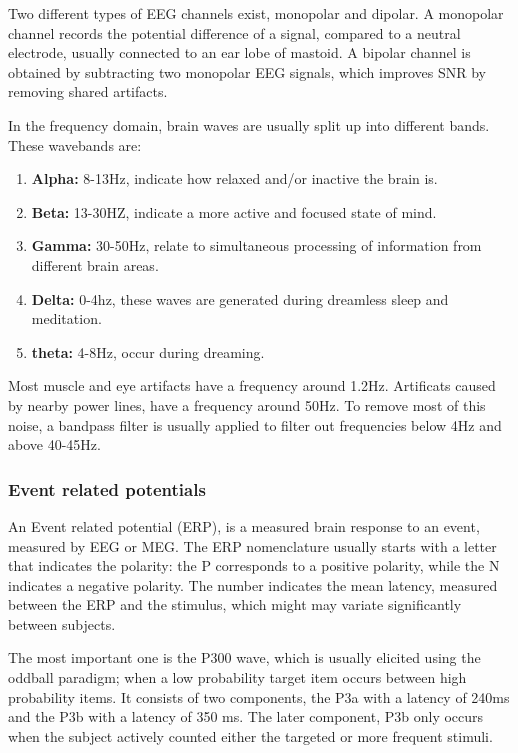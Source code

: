 
Two different types of EEG channels exist, monopolar and dipolar. A monopolar channel records the potential difference of a signal, compared to a neutral electrode, usually connected to an ear lobe of mastoid. A bipolar channel is obtained by subtracting two monopolar EEG signals, which improves SNR by removing shared artifacts\cite{MonoBiPolar}. 

In the frequency domain, brain waves are usually split up into different bands\cite{EmotionRelativePower,WavesSite}. These wavebands are:
\begin{enumerate}
\item \textbf{Alpha:} 8-13Hz, indicate how relaxed and/or inactive the brain is.
\item \textbf{Beta:} 13-30HZ, indicate a more active and focused state of mind.
\item \textbf{Gamma:} 30-50Hz, relate to simultaneous processing of information from different brain areas.
\item \textbf{Delta:} 0-4hz, these waves are generated during dreamless sleep and meditation.
\item \textbf{theta:} 4-8Hz, occur during dreaming.
\end{enumerate}
Most muscle and eye artifacts have a frequency around 1.2Hz. Artificats caused by nearby power lines, have a frequency around 50Hz\cite{ExtendedPaper}. To remove most of this noise, a bandpass filter is usually applied to filter out frequencies below 4Hz and above 40-45Hz.

\subsubsection{Event related potentials}

An Event related potential (ERP), is a measured brain response to an event, measured by EEG or MEG. The ERP nomenclature usually starts with a letter that indicates the polarity: the P corresponds to a positive polarity, while the N indicates a negative polarity. The number indicates the mean latency, measured between the ERP and the stimulus, which might may variate significantly between subjects.

\npar

The most important one is the P300 wave, which is usually elicited using the oddball paradigm; when a low probability target item occurs between high probability items. It consists of two components, the P3a with a latency of 240ms and the P3b with a latency of 350 ms\cite{P300TwoParts}. The later component, P3b only occurs when the subject actively counted either the targeted or more frequent stimuli.

